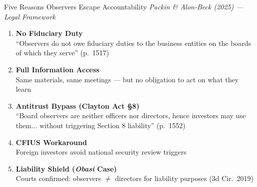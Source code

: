 \documentclass[aspectratio=169,12pt]{beamer}
\begin{document}
\begin{frame}{Five Reasons Observers Escape Accountability}
\small
\textit{Packin \& Alon-Beck (2025) --- Legal Framework}
\vspace{0.3em}

\begin{enumerate}
\item \textbf{No Fiduciary Duty} \\
\footnotesize ``Observers do not owe fiduciary duties to the business entities on the boards of which they serve'' (p.\ 1517)
\normalsize

\item \textbf{Full Information Access} \\
\footnotesize Same materials, same meetings --- but no obligation to act on what they learn

\item \textbf{Antitrust Bypass (Clayton Act \S 8)} \\
\footnotesize ``Board observers are neither officers nor directors, hence investors may use them... without triggering Section 8 liability'' (p.\ 1552)

\item \textbf{CFIUS Workaround} \\
\footnotesize Foreign investors avoid national security review triggers

\item \textbf{Liability Shield (\textit{Obasi} Case)} \\
\footnotesize Courts confirmed: observers $\neq$ directors for liability purposes (3d Cir.\ 2019)
\end{enumerate}
\end{frame}
\end{document}
